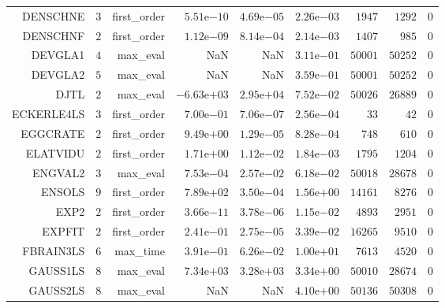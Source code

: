 \begin{longtable}{rrrrrrrrr}
DENSCHNE & \(     3\) & first\_order & \( 5.51\)e\(-10\) & \( 4.69\)e\(-05\) & \( 2.26\)e\(-03\) & \(  1947\) & \(  1292\) & \(     0\) \\
DENSCHNF & \(     2\) & first\_order & \( 1.12\)e\(-09\) & \( 8.14\)e\(-04\) & \( 2.14\)e\(-03\) & \(  1407\) & \(   985\) & \(     0\) \\
DEVGLA1 & \(     4\) & max\_eval &       NaN &       NaN & \( 3.11\)e\(-01\) & \( 50001\) & \( 50252\) & \(     0\) \\
DEVGLA2 & \(     5\) & max\_eval &       NaN &       NaN & \( 3.59\)e\(-01\) & \( 50001\) & \( 50252\) & \(     0\) \\
DJTL & \(     2\) & max\_eval & \(-6.63\)e\(+03\) & \( 2.95\)e\(+04\) & \( 7.52\)e\(-02\) & \( 50026\) & \( 26889\) & \(     0\) \\
ECKERLE4LS & \(     3\) & first\_order & \( 7.00\)e\(-01\) & \( 7.06\)e\(-07\) & \( 2.56\)e\(-04\) & \(    33\) & \(    42\) & \(     0\) \\
EGGCRATE & \(     2\) & first\_order & \( 9.49\)e\(+00\) & \( 1.29\)e\(-05\) & \( 8.28\)e\(-04\) & \(   748\) & \(   610\) & \(     0\) \\
ELATVIDU & \(     2\) & first\_order & \( 1.71\)e\(+00\) & \( 1.12\)e\(-02\) & \( 1.84\)e\(-03\) & \(  1795\) & \(  1204\) & \(     0\) \\
ENGVAL2 & \(     3\) & max\_eval & \( 7.53\)e\(-04\) & \( 2.57\)e\(-02\) & \( 6.18\)e\(-02\) & \( 50018\) & \( 28678\) & \(     0\) \\
ENSOLS & \(     9\) & first\_order & \( 7.89\)e\(+02\) & \( 3.50\)e\(-04\) & \( 1.56\)e\(+00\) & \( 14161\) & \(  8276\) & \(     0\) \\
EXP2 & \(     2\) & first\_order & \( 3.66\)e\(-11\) & \( 3.78\)e\(-06\) & \( 1.15\)e\(-02\) & \(  4893\) & \(  2951\) & \(     0\) \\
EXPFIT & \(     2\) & first\_order & \( 2.41\)e\(-01\) & \( 2.75\)e\(-05\) & \( 3.39\)e\(-02\) & \( 16265\) & \(  9510\) & \(     0\) \\
FBRAIN3LS & \(     6\) & max\_time & \( 3.91\)e\(-01\) & \( 6.26\)e\(-02\) & \( 1.00\)e\(+01\) & \(  7613\) & \(  4520\) & \(     0\) \\
GAUSS1LS & \(     8\) & max\_eval & \( 7.34\)e\(+03\) & \( 3.28\)e\(+03\) & \( 3.34\)e\(+00\) & \( 50010\) & \( 28674\) & \(     0\) \\
GAUSS2LS & \(     8\) & max\_eval &       NaN &       NaN & \( 4.10\)e\(+00\) & \( 50136\) & \( 50308\) & \(     0\) \\

\end{longtable}
